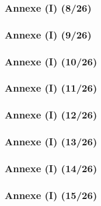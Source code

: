 \documentclass{beamer}
\begin{document}
{\begin{frame}
\frametitle{Annexe (I) (8/26)}



\end{frame}

\begin{frame}
\frametitle{Annexe (I) (9/26)}



\end{frame}

\begin{frame}
\frametitle{Annexe (I) (10/26)}



\end{frame}

\begin{frame}
\frametitle{Annexe (I) (11/26)}



\end{frame}

\begin{frame}
\frametitle{Annexe (I) (12/26)}



\end{frame}

\begin{frame}
\frametitle{Annexe (I) (13/26)}



\end{frame}

\begin{frame}
\frametitle{Annexe (I) (14/26)}



\end{frame}

\begin{frame}
\frametitle{Annexe (I) (15/26)}


\end{frame}}
\end{document}
